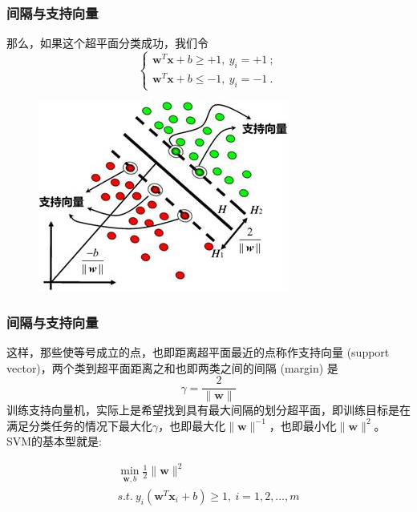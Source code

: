 \begin{frame}
\frametitle{间隔与支持向量}
那么，如果这个超平面分类成功，我们令
\[\begin{cases}
\boldsymbol{w}^T\boldsymbol{x}+b\geq+1,\ y_i=+1\ ;\\
\boldsymbol{w}^T\boldsymbol{x}+b\leq-1,\ y_i=-1\ .
\end{cases} \]

	\begin{figure}[ht]
	\centering
	\includegraphics[width=0.5\linewidth]{partition/img/svm_11.jpg}  
	\end{figure}
\end{frame}

\begin{frame}
\frametitle{间隔与支持向量}

这样，那些使等号成立的点，也即距离超平面最近的点称作支持向量 (support vector)，两个类到超平面距离之和也即两类之间的间隔 (margin) 是
\[
\gamma=\frac{2}{\|\boldsymbol{w}\|}
\]
训练支持向量机，实际上是希望找到具有最大间隔的划分超平面，即训练目标是在满足分类任务的情况下最大化$\gamma$，也即最大化$\|\boldsymbol{w}\|^{-1}$，也即最小化$\|\boldsymbol{w}\|^2$。
SVM的基本型就是:

\begin{gather*}
\min\limits_{\boldsymbol{w},b} \frac{1}{2}\|\boldsymbol{w}\|^2\\
s.t.\ y_i(\boldsymbol{w}^T\boldsymbol{x}_i+b)\geq1,\ i=1,2,\dots,m
\end{gather*}

\end{frame}

